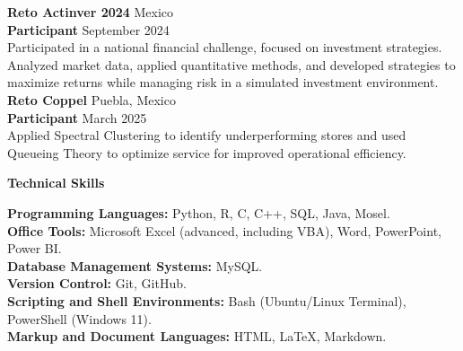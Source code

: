 \documentclass[9pt]{extarticle} %
\begin{document}
\textbf{Reto Actinver 2024} \hfill Mexico\\
\textbf{Participant} \hfill September 2024\\
Participated in a national financial challenge, focused on investment strategies. Analyzed market data, applied quantitative methods, and developed strategies to maximize returns while managing risk in a simulated investment environment.\\


\textbf{Reto Coppel} \hfill Puebla, Mexico\\
\textbf{Participant} \hfill March 2025\\
Applied Spectral Clustering to identify underperforming stores and used Queueing Theory to optimize service for improved operational efficiency.














\begin{center}
    \vspace{1ex}
    \textbf{Technical Skills}
    \vspace{-1ex}
\end{center}

\textbf{Programming Languages:} Python, R, C, C++, SQL, Java, Mosel.\\
\textbf{Office Tools:} Microsoft Excel (advanced, including VBA), Word, PowerPoint, Power BI.\\
\textbf{Database Management Systems:} MySQL.\\
\textbf{Version Control:} Git, GitHub.\\
\textbf{Scripting and Shell Environments:} Bash (Ubuntu/Linux Terminal), PowerShell (Windows 11).\\
\textbf{Markup and Document Languages:} HTML, LaTeX, Markdown.\\
\end{document}
